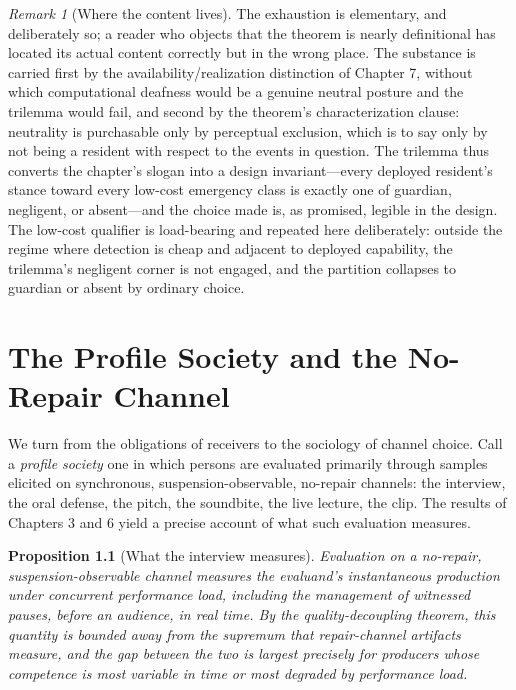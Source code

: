\documentclass[11pt,oneside]{book}
\theoremstyle{plain}
\newtheorem{proposition}[theorem]{Proposition}
\theoremstyle{definition}
\theoremstyle{remark}
\newtheorem{remark}[theorem]{Remark}
\begin{document}
\begin{remark}[Where the content lives]
The exhaustion is elementary, and deliberately so; a reader who objects that the theorem is nearly definitional has located its actual content correctly but in the wrong place. The substance is carried first by the availability/realization distinction of Chapter 7, without which computational deafness would be a genuine neutral posture and the trilemma would fail, and second by the theorem's characterization clause: neutrality is purchasable only by perceptual exclusion, which is to say only by not being a resident with respect to the events in question. The trilemma thus converts the chapter's slogan into a design invariant---every deployed resident's stance toward every low-cost emergency class is exactly one of guardian, negligent, or absent---and the choice made is, as promised, legible in the design. The low-cost qualifier is load-bearing and repeated here deliberately: outside the regime where detection is cheap and adjacent to deployed capability, the trilemma's negligent corner is not engaged, and the partition collapses to guardian or absent by ordinary choice.
\end{remark}

\chapter{The Profile Society and the No-Repair Channel}

We turn from the obligations of receivers to the sociology of channel choice. Call a \emph{profile society} one in which persons are evaluated primarily through samples elicited on synchronous, suspension-observable, no-repair channels: the interview, the oral defense, the pitch, the soundbite, the live lecture, the clip. The results of Chapters 3 and 6 yield a precise account of what such evaluation measures.

\begin{proposition}[What the interview measures]
Evaluation on a no-repair, suspension-observable channel measures the evaluand's instantaneous production under concurrent performance load, including the management of witnessed pauses, before an audience, in real time. By the quality-decoupling theorem, this quantity is bounded away from the supremum that repair-channel artifacts measure, and the gap between the two is largest precisely for producers whose competence is most variable in time or most degraded by performance load.
\end{proposition}
\end{document}
